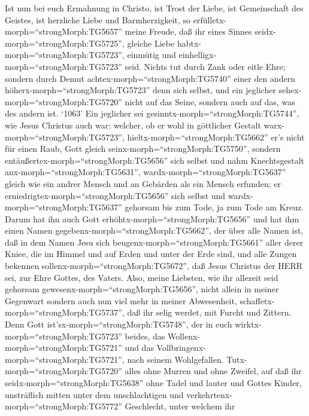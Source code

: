  Ist nun bei euch Ermahnung in Christo, ist Trost der Liebe,
ist Gemeinschaft des Geistes, ist herzliche Liebe und Barmherzigkeit,
 so erfülletx-morph=``strongMorph:TG5657'' meine Freude, daß
ihr eines Sinnes seidx-morph=``strongMorph:TG5725'', gleiche Liebe
habtx-morph=``strongMorph:TG5723'', einmütig und
einhelligx-morph=``strongMorph:TG5723'' seid.  Nichts tut
durch Zank oder eitle Ehre; sondern durch Demut
achtex-morph=``strongMorph:TG5740'' einer den andern
höherx-morph=``strongMorph:TG5723'' denn sich selbst,  und
ein jeglicher sehex-morph=``strongMorph:TG5720'' nicht auf das Seine,
sondern auch auf das, was des andern ist.  `1063' Ein
jeglicher sei gesinntx-morph=``strongMorph:TG5744'', wie Jesus Christus
auch war:  welcher, ob er wohl in göttlicher Gestalt
warx-morph=``strongMorph:TG5723'', hieltx-morph=``strongMorph:TG5662''
er's nicht für einen Raub, Gott gleich
seinx-morph=``strongMorph:TG5750'',  sondern
entäußertex-morph=``strongMorph:TG5656'' sich selbst und nahm
Knechtsgestalt anx-morph=``strongMorph:TG5631'',
wardx-morph=``strongMorph:TG5637'' gleich wie ein andrer Mensch und an
Gebärden als ein Mensch erfunden;  er
erniedrigtex-morph=``strongMorph:TG5656'' sich selbst und
wardx-morph=``strongMorph:TG5637'' gehorsam bis zum Tode, ja zum Tode am
Kreuz.  Darum hat ihn auch Gott
erhöhtx-morph=``strongMorph:TG5656'' und hat ihm einen Namen
gegebenx-morph=``strongMorph:TG5662'', der über alle Namen ist,
 daß in dem Namen Jesu sich
beugenx-morph=``strongMorph:TG5661'' aller derer Kniee, die im Himmel
und auf Erden und unter der Erde sind,  und alle Zungen
bekennen sollenx-morph=``strongMorph:TG5672'', daß Jesus Christus der
HERR sei, zur Ehre Gottes, des Vaters.  Also, meine
Liebsten, wie ihr allezeit seid gehorsam
gewesenx-morph=``strongMorph:TG5656'', nicht allein in meiner Gegenwart
sondern auch nun viel mehr in meiner Abwesenheit,
schaffetx-morph=``strongMorph:TG5737'', daß ihr selig werdet, mit Furcht
und Zittern.  Denn Gott
ist'sx-morph=``strongMorph:TG5748'', der in euch
wirktx-morph=``strongMorph:TG5723'' beides, das
Wollenx-morph=``strongMorph:TG5721'' und das
Vollbringenx-morph=``strongMorph:TG5721'', nach seinem Wohlgefallen.
 Tutx-morph=``strongMorph:TG5720'' alles ohne Murren und
ohne Zweifel,  auf daß ihr
seidx-morph=``strongMorph:TG5638'' ohne Tadel und lauter und Gottes
Kinder, unsträflich mitten unter dem unschlachtigen und
verkehrtenx-morph=``strongMorph:TG5772'' Geschlecht, unter welchem ihr
